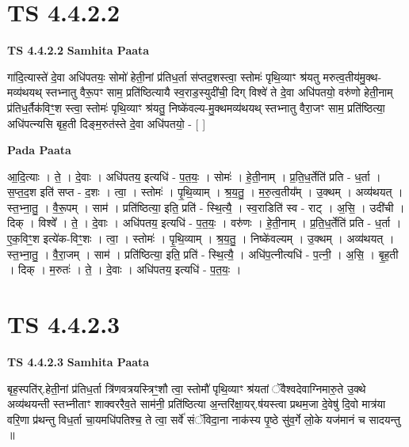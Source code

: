 \documentclass[17pt]{extarticle}
\begin{document}
\section*{ TS 4.4.2.2 }

\textbf{TS 4.4.2.2 } \newline
\textbf{Samhita Paata} \newline

गा॑दि॒त्यास्ते॑ दे॒वा अधि॑पतयः॒ सोमो॑ हेती॒नां प्र॑तिध॒र्ता स॑प्तद॒शस्त्वा॒ स्तोमः॑ पृथि॒व्याꣳ श्र॑यतु मरुत्व॒तीय॑मु॒क्थ-मव्य॑थयथ् स्तभ्नातु वैरू॒पꣳ साम॒ प्रति॑ष्ठित्यायै स्व॒राड॒स्युदी॑ची॒ दिग् विश्वे॑ ते दे॒वा अधि॑पतयो॒ वरु॑णो हेती॒नाम् प्र॑तिध॒र्तैक॑विꣳ॒॒श स्त्वा॒ स्तोमः॑ पृथि॒व्याꣳ श्र॑यतु॒ निष्के॑वल्य-मु॒क्थमव्य॑थयथ् स्तभ्नातु वैरा॒जꣳ साम॒ प्रति॑ष्ठित्या॒ अधि॑पत्न्यसि बृह॒ती दिङ्म॒रुत॑स्ते दे॒वा अधि॑पतयो॒ - [  ] \newline

\textbf{Pada Paata} \newline

आ॒दि॒त्याः । ते॒ । दे॒वाः । अधि॑पतय॒ इत्यधि॑ - प॒त॒यः॒ । सोमः॑ । हे॒ती॒नाम् । प्र॒ति॒ध॒र्तेति॑ प्रति - ध॒र्ता । स॒प्त॒द॒श इति॑ सप्त - द॒शः । त्वा॒ । स्तोमः॑ । पृ॒थि॒व्याम् । श्र॒य॒तु॒ । म॒रु॒त्व॒तीय᳚म् । उ॒क्थम् । अव्य॑थयत् । स्त॒भ्ना॒तु॒ । वै॒रू॒पम् । साम॑ । प्रति॑ष्ठित्या॒ इति॒ प्रति॑ - स्थि॒त्यै॒ । स्व॒राडिति॑ स्व - राट् । अ॒सि॒ । उदी॑ची । दिक् । विश्वे᳚ । ते॒ । दे॒वाः । अधि॑पतय॒ इत्यधि॑ - प॒त॒यः॒ । वरु॑णः । हे॒ती॒नाम् । प्र॒ति॒ध॒र्तेति॑ प्रति - ध॒र्ता । ए॒क॒विꣳ॒॒श इत्ये॑क-विꣳ॒॒शः । त्वा॒ । स्तोमः॑ । पृ॒थि॒व्याम् । श्र॒य॒तु॒ । निष्के॑वल्यम् । उ॒क्थम् । अव्य॑थयत् । स्त॒भ्ना॒तु॒ । वै॒रा॒जम् । साम॑ । प्रति॑ष्ठित्या॒ इति॒ प्रति॑ - स्थि॒त्यै॒ । अधि॑प॒त्नीत्यधि॑ - प॒त्नी॒ । अ॒सि॒ । बृ॒ह॒ती । दिक् । म॒रुतः॑ । ते॒ । दे॒वाः । अधि॑पतय॒ इत्यधि॑ - प॒त॒यः॒ ।  \newline




\section*{ TS 4.4.2.3 }

\textbf{TS 4.4.2.3 } \newline
\textbf{Samhita Paata} \newline

बृह॒स्पति॑र्.हेती॒नां प्र॑तिध॒र्ता त्रि॑णवत्रयस्त्रिꣳ॒॒शौ त्वा॒ स्तोमौ॑ पृथि॒व्याꣳ श्र॑यतां ॅवैश्वदेवाग्निमारु॒ते उ॒क्थे अव्य॑थयन्ती स्तभ्नीताꣳ शाक्वररैव॒ते साम॑नी॒ प्रति॑ष्ठित्या अ॒न्तरि॑क्षा॒यर्.ष॑यस्त्वा प्रथम॒जा दे॒वेषु॑ दि॒वो मात्र॑या वरि॒णा प्र॑थन्तु विध॒र्ता चा॒यमधि॑पतिश्च॒ ते त्वा॒ सर्वे॑ संॅविदा॒ना नाक॑स्य पृ॒ष्ठे सु॑व॒र्गे लो॒के यज॑मानं च सादयन्तु ॥ \newline
\end{document}
